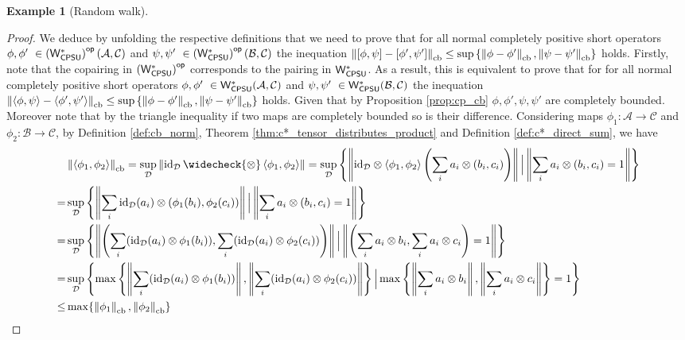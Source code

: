 \documentclass[10pt,a4paper]{amsart}
\theoremstyle{definition}
\theoremstyle{definition}
\newtheorem{example}[definition]{Example}
\theoremstyle{definition}
\theoremstyle{definition}
\theoremstyle{definition}
\theoremstyle{definition}
\begin{document}
\begin{example}[Random walk]
\begin{proof}
  We deduce by unfolding the respective definitions that we need to prove that for all normal completely positive short operators $\phi, \phi' \in \WstarCPSUop(\mathcal{A}, \mathcal{C})  $ and $\psi, \psi' \in \WstarCPSUop(\mathcal{B}, \mathcal{C})$ the inequation $\left\lVert [\phi, \psi] - [\phi', \psi'] \right\rVert_{\text{cb}} \leq  \sup \left\{ \left\lVert \phi-\phi' \right\rVert_{\text{cb}}, \left\lVert \psi-\psi' \right\rVert_{\text{cb}} \right\}$ holds.
  Firstly, note that the copairing in $\left(\mathsf{W^*_{CPSU}}\right)^{\mathsf{op}}$ corresponds to the pairing in $\mathsf{W^*_{CPSU}}$. As a result, this is equivalent to prove that for for all normal completely positive short operators $\phi, \phi' \in \WstarCPSU(\mathcal{A}, \mathcal{C})  $ and $\psi, \psi' \in \WstarCPSU(\mathcal{B}, \mathcal{C})$ the inequation $\left\lVert \langle \phi, \psi \rangle - \langle \phi', \psi'\rangle \right\rVert_{\text{cb}} \leq  \sup \left\{ \left\lVert \phi-\phi' \right\rVert_{\text{cb}}, \left\lVert \psi-\psi' \right\rVert_{\text{cb}} \right\}$ holds. Given that by Proposition \ref{prop:cp_cb} $\phi, \phi', \psi, \psi'$ are completely bounded. Moreover note that by the triangle inequality if two maps are completely bounded so is their difference. 
  Considering maps $\phi_1: \mathcal{A} \to \mathcal{C}$ and $\phi_2: \mathcal{B} \to \mathcal{C}$, by Definition \ref{def:cb_norm}, Theorem \ref{thm:c*_tensor_distributes_product} and Definition \ref{def:c*_direct_sum}, we have
\begin{align*}
  & \cbnorm{\langle \phi_1, \phi_2 \rangle} 
  =  \sup_{\mathcal{D}} \|\id_{\mathcal{D}}\, \widecheck{\otimes} \, \langle \phi_1, \phi_2 \rangle\| =  \sup_{\mathcal{D}} \left\{\norm{\id_{\mathcal{D}} \otimes  \langle \phi_1, \phi_2 \rangle  \left(\sum_i a_i \otimes (b_i,c_i)\right)} \Big| \norm{\sum_i a_i \otimes (b_i,c_i)=1} \right\} \\
  = &  \sup_{\mathcal{D}} \left\{\norm{  \sum_i \id_{\mathcal{D}}(a_i) \otimes (\phi_1 (b_i),\phi_2 (c_i))} \Big| \norm{\sum_i a_i \otimes (b_i,c_i)=1} \right\} \\
  = & \sup_{\mathcal{D}} \left\{\norm{  \left(\sum_i (\id_{\mathcal{D}}(a_i) \otimes \phi_1 (b_i)), \sum_i (\id_{\mathcal{D}}(a_i) \otimes \phi_2 (c_i))\right)} \Big| \norm{\left(\sum_i a_i \otimes b_i, \sum_i a_i \otimes c_i\right)=1} \right\} \\
  = & \sup_{\mathcal{D}} \left\{ \max \left\{\norm{  \sum_i (\id_{\mathcal{D}}(a_i) \otimes \phi_1 (b_i))}, \norm{\sum_i (\id_{\mathcal{D}}(a_i) \otimes \phi_2 (c_i))}\right\} \Big| \max \left\{ \norm{\sum_i a_i \otimes b_i}, \norm{\sum_i a_i \otimes c_i} \right\}=1 \right\} \\
  \leq &\max \{ \cbnorm{\phi_1}, \cbnorm{\phi_2} \}
\end{align*}


\end{proof}
\end{example}
\end{document}
